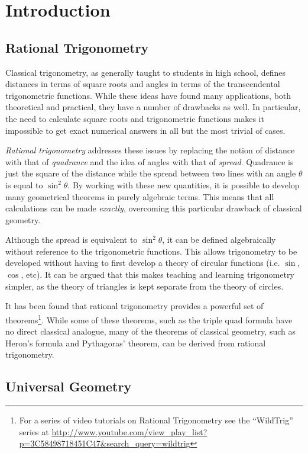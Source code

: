 \chapter{Introduction}

\section{Rational Trigonometry}

Classical trigonometry, as generally taught to students in high school, defines distances in terms of square roots and angles in terms of the transcendental trigonometric functions.
While these ideas have found many applications, both theoretical and practical, they have a number of drawbacks as well.
In particular, the need to calculate square roots and trigonometric functions makes it impossible to get exact numerical answers in all but the most trivial of cases.

\emph{Rational trigonometry}\cite{thebook} addresses these issues by replacing the notion of distance with that of \emph{quadrance} and the idea of angles with that of \emph{spread}.
Quadrance is just the square of the distance while the spread between two lines with an angle $\theta$ is equal to $\sin^2\theta$.
By working with these new quantities, it is possible to develop many geometrical theorems in purely algebraic terms.
This means that all calculations can be made \emph{exactly}, overcoming this particular drawback of classical geometry.

Although the spread is equivalent to $\sin^2\theta$, it can be defined algebraically without reference to the trigonometric functions.
This allows trigonometry to be developed without having to first develop a theory of circular functions (i.e. $\sin$, $\cos$, etc).
It can be argued that this makes teaching and learning trigonometry simpler, as the theory of triangles is kept separate from the theory of circles\cite{horizons}.

It has been found that rational trigonometry provides a powerful set of theorems\footnote{For a series of video tutorials on Rational Trigonometry see the ``WildTrig'' series at \url{http://www.youtube.com/view_play_list?p=3C58498718451C47&search_query=wildtrig}}.
While some of these theorems, such as the triple quad formula\cite{thebook} have no direct classical analogue, many of the theorems of classical geometry, such as Heron's formula and Pythagoras' theorem, can be derived from rational trigonometry\cite{greeks}.


\section{Universal Geometry}

